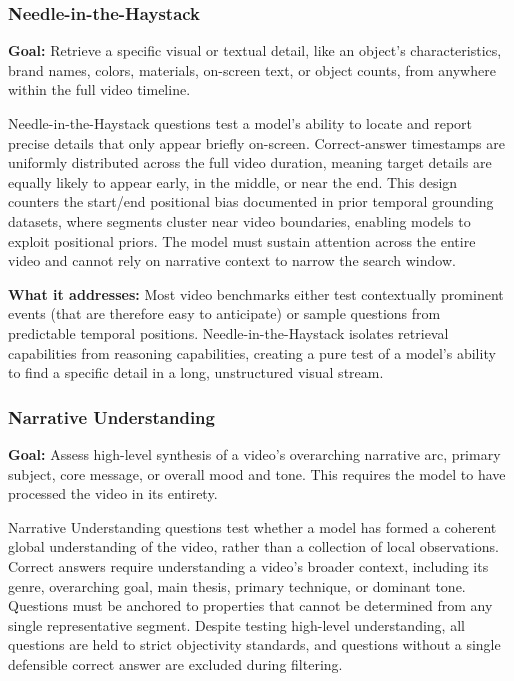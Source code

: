 \documentclass[sigconf,natbib=false,nonacm]{acmart}
\begin{document}
\subsubsection{Needle-in-the-Haystack}

\textbf{Goal:} Retrieve a specific visual or textual detail, like an object's characteristics, brand names, colors, materials, on-screen text, or object counts, from anywhere within the full video timeline.

Needle-in-the-Haystack questions test a model's ability to locate and report precise details that only appear briefly on-screen. Correct-answer timestamps are uniformly distributed across the full video duration, meaning target details are equally likely to appear early, in the middle, or near the end. This design counters the start/end positional bias documented in prior temporal grounding datasets, where segments cluster near video boundaries, enabling models to exploit positional priors. The model must sustain attention across the entire video and cannot rely on narrative context to narrow the search window.

\textbf{What it addresses:} Most video benchmarks either test contextually prominent events (that are therefore easy to anticipate) or sample questions from predictable temporal positions. Needle-in-the-Haystack isolates retrieval capabilities from reasoning capabilities, creating a pure test of a model's ability to find a specific detail in a long, unstructured visual stream.

\subsubsection{Narrative Understanding}

\textbf{Goal:} Assess high-level synthesis of a video's overarching narrative arc, primary subject, core message, or overall mood and tone. This requires the model to have processed the video in its entirety.

Narrative Understanding questions test whether a model has formed a coherent global understanding of the video, rather than a collection of local observations. Correct answers require understanding a video's broader context, including its genre, overarching goal, main thesis, primary technique, or dominant tone. Questions must be anchored to properties that cannot be determined from any single representative segment. Despite testing high-level understanding, all questions are held to strict objectivity standards, and questions without a single defensible correct answer are excluded during filtering.
\end{document}
